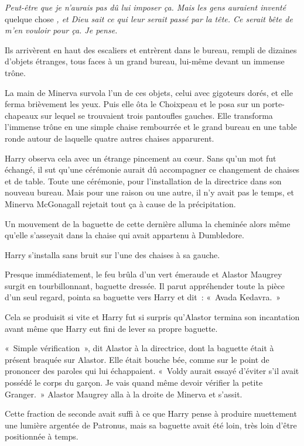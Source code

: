 \emph{Peut-être que je n'aurais pas dû lui imposer ça. Mais les gens auraient inventé} quelque chose \emph{, et Dieu sait ce qui leur serait passé par la tête. Ce serait bête de m'en vouloir pour ça. Je pense.}

Ils arrivèrent en haut des escaliers et entrèrent dans le bureau, rempli de dizaines d'objets étranges, tous faces à un grand bureau, lui-même devant un immense trône.

La main de Minerva survola l'un de ces objets, celui avec gigoteurs dorés, et elle ferma brièvement les yeux. Puis elle ôta le Choixpeau et le posa sur un porte-chapeaux sur lequel se trouvaient trois pantoufles gauches. Elle transforma l'immense trône en une simple chaise rembourrée et le grand bureau en une table ronde autour de laquelle quatre autres chaises apparurent.

Harry observa cela avec un étrange pincement au cœur. Sans qu'un mot fut échangé, il sut qu'une cérémonie aurait dû accompagner ce changement de chaises et de table. Toute une cérémonie, pour l'installation de la directrice dans son nouveau bureau. Mais pour une raison ou une autre, il n'y avait pas le temps, et Minerva McGonagall rejetait tout ça à cause de la précipitation.

Un mouvement de la baguette de cette dernière alluma la cheminée alors même qu'elle s'asseyait dans la chaise qui avait appartenu à Dumbledore.

Harry s'installa sans bruit sur l'une des chaises à sa gauche.

Presque immédiatement, le feu brûla d'un vert émeraude et Alastor Maugrey surgit en tourbillonnant, baguette dressée. Il parut appréhender toute la pièce d'un seul regard, pointa sa baguette vers Harry et dit~: «~Avada Kedavra.~»

Cela se produisit si vite et Harry fut si surpris qu'Alastor termina son incantation avant même que Harry eut fini de lever sa propre baguette.

«~Simple vérification~», dit Alastor à la directrice, dont la baguette était à présent braquée sur Alastor. Elle était bouche bée, comme sur le point de prononcer des paroles qui lui échappaient. «~Voldy aurait essayé d'éviter s'il avait possédé le corps du garçon. Je vais quand même devoir vérifier la petite Granger.~» Alastor Maugrey alla à la droite de Minerva et s'assit.

Cette fraction de seconde avait suffi à ce que Harry pense à produire muettement une lumière argentée de Patronus, mais sa baguette avait été loin, très loin d'être positionnée à temps.

